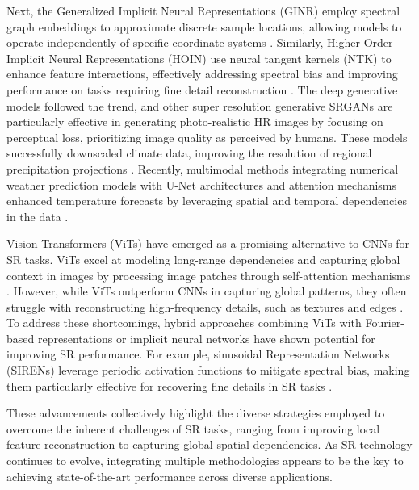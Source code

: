 Next, the Generalized Implicit Neural Representations (GINR) employ spectral graph embeddings to approximate discrete sample locations, allowing models to operate independently of specific coordinate systems \cite{grattarola2022ginr}. Similarly, Higher-Order Implicit Neural Representations (HOIN) use neural tangent kernels (NTK) to enhance feature interactions, effectively addressing spectral bias and improving performance on tasks requiring fine detail reconstruction \cite{chen2024hoin}. The deep generative models followed the trend, and other super resolution generative SRGANs are particularly effective in generating photo-realistic HR images by focusing on perceptual loss, prioritizing image quality as perceived by humans. These models successfully downscaled climate data, improving the resolution of regional precipitation projections \cite{shidqi2023}. Recently, multimodal methods integrating numerical weather prediction models with U-Net architectures and attention mechanisms enhanced temperature forecasts by leveraging spatial and temporal dependencies in the data \cite{Ding2024}.

Vision Transformers (ViTs) have emerged as a promising alternative to CNNs for SR tasks. ViTs excel at modeling long-range dependencies and capturing global context in images by processing image patches through self-attention mechanisms \cite{Dosovitskiy2020}. However, while ViTs outperform CNNs in capturing global patterns, they often struggle with reconstructing high-frequency details, such as textures and edges \cite{bai2022}. To address these shortcomings, hybrid approaches combining ViTs with Fourier-based representations or implicit neural networks have shown potential for improving SR performance. For example, sinusoidal Representation Networks (SIRENs) leverage periodic activation functions to mitigate spectral bias, making them particularly effective for recovering fine details in SR tasks \cite{SIREN}.

These advancements collectively highlight the diverse strategies employed to overcome the inherent challenges of SR tasks, ranging from improving local feature reconstruction to capturing global spatial dependencies. As SR technology continues to evolve, integrating multiple methodologies appears to be the key to achieving state-of-the-art performance across diverse applications.